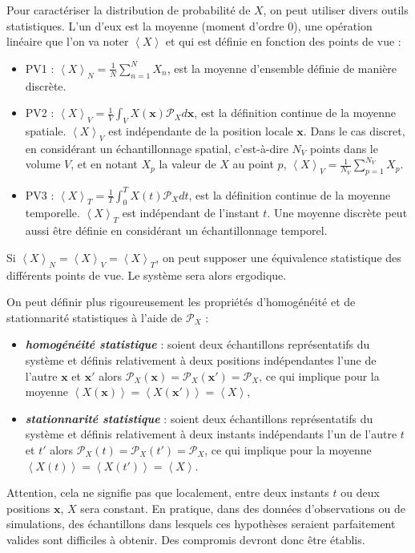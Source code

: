 Pour caractériser la distribution de probabilité de $X$, on peut utiliser divers outils statistiques. L'un d'eux est la moyenne (moment d'ordre 0), une opération linéaire que l'on va noter $\left<X\right>$ et qui est définie en fonction des points de vue :
\begin{itemize}
    \item PV1 : $\left<X\right>_{N} = \frac{1}{N} \sum_{n=1}^N X_n$, est la moyenne d'ensemble définie de manière discrète.
    \item PV2 : $\left<X\right>_{V} = \frac{1}{V} \int_V X(\mathbf{x}) \mathcal{P}_X d\mathbf{x}$, est la définition continue de la moyenne spatiale. $\left<X\right>_V$ est indépendante de la position locale $\mathbf{x}$. Dans le cas discret, en considérant un échantillonnage spatial, c'est-à-dire $N_V$ points dans le volume $V$, et en notant $X_p$ la valeur de $X$ au point $p$, $\left<X\right>_{V} = \frac{1}{N_V} \sum_{p=1}^{N_V} X_p$. 
    \item PV3 : $\left<X\right>_{T} = \frac{1}{T} \int_0^T X(t) \mathcal{P}_X dt$, est la définition continue de la moyenne temporelle. $\left<X\right>_T$ est indépendant de l'instant $t$. Une moyenne discrète peut aussi être définie en considérant un échantillonnage temporel.
\end{itemize}
Si $\left<X\right>_{N} = \left<X\right>_{V} = \left<X\right>_{T}$, on peut supposer une équivalence statistique des différents points de vue. Le système sera alors ergodique. 

On peut définir plus rigoureusement les propriétés d'homogénéité et de stationnarité statistiques à l'aide de $\mathcal{P}_X$ : 
\begin{itemize}
    \item \textbf{\emph{homogénéité statistique}} : soient deux échantillons représentatifs du système et définis relativement à deux positions indépendantes l'une de l'autre $\mathbf{x}$ et $\mathbf{x'}$ alors  $\mathcal{P}_X(\mathbf{x}) = \mathcal{P}_X(\mathbf{x'}) = \mathcal{P}_X$, ce qui implique pour la moyenne $\left<X(\mathbf{x})\right> = \left<X(\mathbf{x'})\right> = \left<X\right>$,
    \item \textbf{\emph{stationnarité statistique}} : soient deux échantillons représentatifs du système et définis relativement à deux instants indépendants l'un de l'autre $t$ et $t'$ alors $\mathcal{P}_X(t) = \mathcal{P}_X(t') = \mathcal{P}_X$, ce qui implique pour la moyenne $\left<X(t)\right> = \left<X(t')\right> = \left<X\right>$.
\end{itemize}
Attention, cela ne signifie pas que localement, entre deux instants $t$ ou deux positions $\mathbf{x}$, $X$ sera constant. En pratique, dans des données d'observations ou de simulations, des échantillons dans lesquels ces hypothèses seraient parfaitement valides sont difficiles à obtenir. Des compromis devront donc être établis. 

